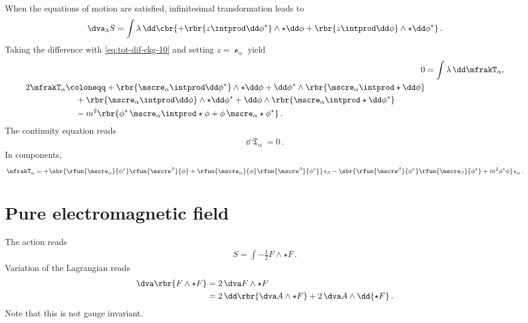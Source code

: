 \documentclass[a4paper]{article}
\begin{document}
When the equations of motion are satisfied, infinitesimal 
transformation leads to
\begin{align}
\dva_{\lambda} S = \int \lambda\,\dd\cbr{
	+\rbr{z\intprod\dd\phi^*}\wedge\star\dd\phi
	+\rbr{z\intprod\dd\phi}\wedge\star\dd\phi^*}\,.
\end{align}
Taking the difference with \cref{eq:tot-dif-ckg-10} and setting $z = 
\mscre_{\alpha}$ yield
\begin{align}
0 &= \int \lambda\,\dd \mfrakT_{\alpha}, \\
\begin{split}
2 \mfrakT_{\alpha} &\coloneqq
+\rbr{\mscre_{\alpha}\intprod\dd\phi^*}\wedge\star\dd\phi +
\dd\phi^*\wedge\rbr{\mscre_{\alpha}\intprod\star\dd\phi}
\\
&\quad\,+
\rbr{\mscre_{\alpha}\intprod\dd\phi}\wedge\star\dd\phi^* +
\dd\phi\wedge\rbr{\mscre_{\alpha}\intprod\star\dd\phi^*}
\\
&\quad\,-
m^2\rbr{\phi^*\,\mscre_{\alpha}\intprod\star\phi +
	\phi\,\mscre_{\alpha}\star\phi^*}\,.
\end{split}
\end{align}
The continuity equation reads
\begin{align}
\dd \mfrakT_{\alpha} = 0\,.
\end{align}
In components,
\begin{align}
\mfrakT_{\alpha} =
+\sbr{\rfun{\mscre_{\alpha}}{\phi^*} \rfun{\mscre^{\beta}}{\phi}+
	\rfun{\mscre_{\alpha}}{\phi} \rfun{\mscre^{\beta}}{\phi^*}}\,
		\epsilon_{\beta} -
\sbr{\rfun{\mscre^{\beta}}{\phi^*} \rfun{\mscre_{\beta}}{\phi^*}
	+ m^2 \phi^* \phi}\, \epsilon_{\alpha}\,.
\end{align}

\section{Pure electromagnetic field}


The action reads
\begin{align}
S = \int -\frac{1}{2} F \wedge \star F\,.
\end{align}
Variation of the Lagrangian reads
\begin{align}
\dva \rbr{F\wedge\star F} &=
	2\,\dva F \wedge \star F
\\ &=
	2\,\dd\rbr{\dva A \wedge \star F} + 2\,\dva A \wedge \dd {\star F}\,.
\end{align}
Note that this is not gauge invariant.
\end{document}
